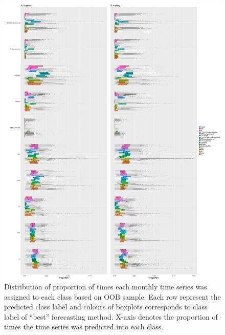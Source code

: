 \documentclass[11pt,a4paper,]{article}
\begin{document}
\begin{figure}
\centering
\includegraphics{figures/oobquarterlymonthly2-1.png}
\caption{\label{fig:oobquarterlymonthly2} Distribution of proportion of
times each monthly time series was assigned to each class based on OOB
sample. Each row represent the predicted class label and colours of
boxplots corresponds to class label of ``best'' forecasting method.
X-axis denotes the proportion of times the time series was predicted
into each class.}
\end{figure}

\clearpage
\end{document}
